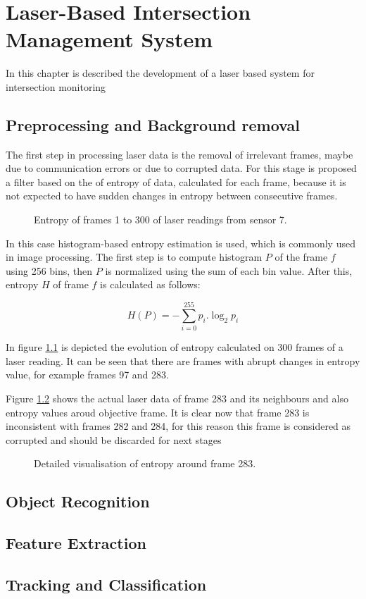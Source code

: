 
\chapter [Laser-Based IMS]{Laser-Based Intersection Management System}

In this chapter is described the development of a laser based system for intersection monitoring

\section{Preprocessing and Background removal}

The first step in processing laser data is the removal of irrelevant frames, maybe due to communication errors or due to corrupted data. For this stage is proposed a filter based on the of entropy of data, calculated for each frame, because it is not expected to have sudden changes in entropy between consecutive frames. 

\begin{figure}[ht!]
\centering

\caption{Entropy of frames 1 to 300 of laser readings from sensor 7.}
\label{entropy_frames}
\end{figure}

In this case histogram-based entropy estimation is used, which is commonly used in image processing. The first step is to compute histogram $P$ of the frame $f$ using 256 bins, then $P$ is normalized using the sum of each bin value. After this, entropy $H$ of frame $f$ is calculated as follows:

\begin{equation}
 H(P)=-\sum_{i=0}^{255}{ p_i.\log_{2}{p_i}} 
\end{equation}

In figure \ref{entropy_frames} is depicted the evolution of entropy calculated on 300 frames of a laser reading. It can be seen that there are frames with abrupt changes in entropy value, for example frames 97 and 283.


Figure \ref{l7-f283} shows the actual laser data of frame 283 and its neighbours and also entropy values aroud objective frame. It is clear now that frame 283 is inconsistent with frames 282 and 284, for this reason this frame is considered as corrupted and should be discarded for next stages

\begin{figure}[ht!]
\centering

\caption{Detailed visualisation of entropy around frame 283.}
\label{l7-f283}
\end{figure}



\section{Object Recognition}
\section{Feature Extraction}
\section{Tracking and Classification}
